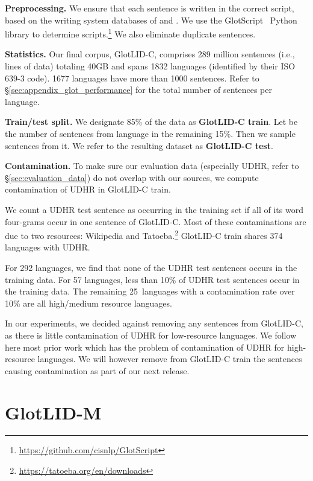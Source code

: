 \documentclass[11pt]{article}
\def\numberlanguagestotal{1832\xspace}
\def\modelname{\mbox{GlotLID-M}\xspace}
\def\corpusname{\mbox{GlotLID-C}\xspace}
\def\udhr{UDHR\xspace}
\def\secref#1{\S\ref{sec:#1}}
\begin{document}
\textbf{Preprocessing.} We ensure that each sentence is written in the correct script, based on the writing system databases of \citet{kargaran2023glotscript} and \citet{van-esch-etal-2022-writing}. We use the GlotScript~\citep{kargaran2023glotscript} Python library to determine scripts.\footnote{\url{https://github.com/cisnlp/GlotScript}} We also eliminate duplicate sentences.

\textbf{Statistics.}
Our final corpus, \corpusname, comprises 289 million
sentences (i.e., lines of data) totaling 40GB and spans
\numberlanguagestotal languages (identified by their ISO
639-3 code). 1677
languages have more than 1000 sentences.
Refer to \secref{appendix_glot_performance} for the total number of sentences per language.

\textbf{Train/test split.}
We designate 85\% of the data
as \textbf{\corpusname train}.
Let  be the number of sentences from language  
in the remaining 15\%. 
Then we sample  sentences from it.
We refer to the resulting dataset
as \textbf{\corpusname test}.

\textbf{Contamination.} To make sure our evaluation data (especially \udhr, refer to \secref{evaluation_data})
do not overlap with our sources, we compute contamination of \udhr in \corpusname train.

We count a \udhr test sentence as occurring in the training set if all of its word four-grams occur in one sentence of \corpusname. 
Most of these contaminations are due to two resources: Wikipedia and
Tatoeba.\footnote{\url{https://tatoeba.org/en/downloads}}
\corpusname train shares 374 languages with \udhr.

For 292 languages, we find that none of the \udhr test sentences occurs in the training data. For 57 languages, less than 10\% of \udhr test sentences occur in the training data. The remaining 25~languages with a contamination rate over 10\% are all high/medium resource languages.

In our experiments, we decided against removing any sentences from \corpusname, as there is little contamination of \udhr for low-resource languages. We follow here most prior work which has the problem of contamination of \udhr for high-resource languages. We will however remove from \corpusname train the sentences causing contamination as part of our next release.


\section{\modelname}
\end{document}
